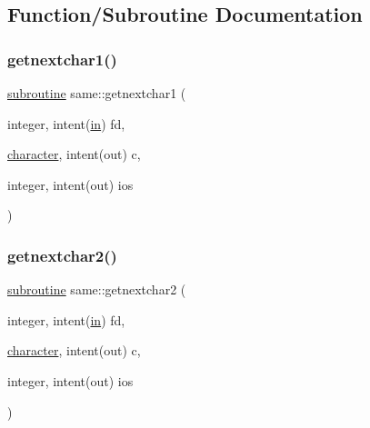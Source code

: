 \subsection{Function/\+Subroutine Documentation}
\mbox{\label{__cmp_8f90_a8bfff852996edc0f1e98b9ad7cd83dae}} 
\subsubsection{\texorpdfstring{getnextchar1()}{getnextchar1()}}
{\footnotesize\ttfamily \hyperlink{M__stopwatch_83_8txt_acfbcff50169d691ff02d4a123ed70482}{subroutine} same\+::getnextchar1 (\begin{DoxyParamCaption}\item[{integer, intent(\hyperlink{M__journal_83_8txt_afce72651d1eed785a2132bee863b2f38}{in})}]{fd,  }\item[{\hyperlink{option__stopwatch_83_8txt_abd4b21fbbd175834027b5224bfe97e66}{character}, intent(out)}]{c,  }\item[{integer, intent(out)}]{ios }\end{DoxyParamCaption})}

\mbox{\label{__cmp_8f90_acbf875fdb593609438c33f5b8182e7d4}} 
\subsubsection{\texorpdfstring{getnextchar2()}{getnextchar2()}}
{\footnotesize\ttfamily \hyperlink{M__stopwatch_83_8txt_acfbcff50169d691ff02d4a123ed70482}{subroutine} same\+::getnextchar2 (\begin{DoxyParamCaption}\item[{integer, intent(\hyperlink{M__journal_83_8txt_afce72651d1eed785a2132bee863b2f38}{in})}]{fd,  }\item[{\hyperlink{option__stopwatch_83_8txt_abd4b21fbbd175834027b5224bfe97e66}{character}, intent(out)}]{c,  }\item[{integer, intent(out)}]{ios }\end{DoxyParamCaption})}

\mbox{\label{__cmp_8f90_a3e09a3b52ee8fb04eeb93fe5761626a8}} 
